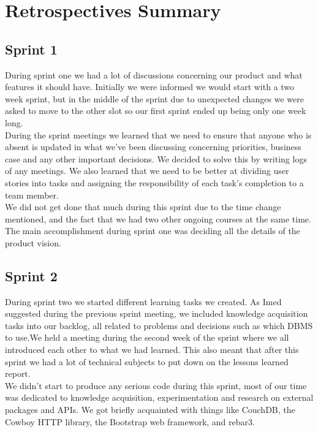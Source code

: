 \chapter{Retrospectives Summary}
\section{Sprint 1}
During sprint one we had a lot of discussions concerning our product and what
features it should have. Initially we were informed we would start with a two
week sprint, but in the middle of the sprint due to unexpected changes we were
asked to move to the other slot so our first sprint ended up being only one week
long. \\

During the sprint meetings we learned that we need to ensure that anyone who is
absent is updated in what we’ve been discussing concerning priorities, business
case and any other important decisions. We decided to solve this by writing logs
of any meetings. We also learned that we need to be better at dividing user
stories into tasks and assigning the responsibility of each task’s completion to
a team member. \\

We did not get done that much during this sprint due to the time change
mentioned, and the fact that we had two other ongoing courses at the same time.
The main accomplishment during sprint one was deciding all the details of the
product vision.

\section{Sprint 2}
During sprint two we started different learning tasks we created. As Imed
suggested during the previous sprint meeting, we included knowledge acquisition
tasks into our backlog, all related to problems and decisions such as which DBMS
to use.We held a meeting during the second week of the sprint where we all
introduced each other to what we had learned. This also meant that after this
sprint we had a lot of technical subjects to put down on the lessons learned
report. \\

We didn’t start to produce any serious code during this sprint, most of our time
was dedicated to knowledge acquisition, experimentation and research on external
packages and APIs. We got briefly acquainted with things like CouchDB, the
Cowboy HTTP library, the Bootstrap web framework, and rebar3. \\

